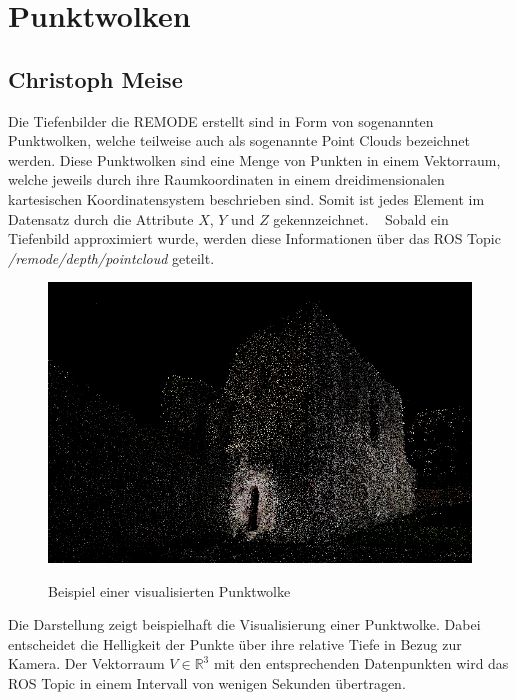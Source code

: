 \section{Punktwolken}
\label{Punktwolken}
\subsection*{Christoph Meise}
Die Tiefenbilder die REMODE erstellt sind in Form von sogenannten Punktwolken, welche teilweise auch als sogenannte Point Clouds bezeichnet werden. Diese Punktwolken sind eine Menge von Punkten in einem Vektorraum, welche jeweils durch ihre Raumkoordinaten in einem dreidimensionalen kartesischen Koordinatensystem beschrieben sind. Somit ist jedes Element im Datensatz durch die Attribute $X$, $Y$ und $Z$ gekennzeichnet. \cite{defPC}\cite{visPC}\ \newline
Sobald ein Tiefenbild approximiert wurde, werden diese Informationen über das ROS Topic \textit{/remode/depth/pointcloud} geteilt. \newline

\begin{figure}[ht]
	\centering
	\includegraphics[scale=0.41]{Bilder/pointcloud_1.jpg}
	\label{fig:pointcloud}
	\caption{Beispiel einer visualisierten Punktwolke \cite{visPC}}
\end{figure}

Die Darstellung zeigt beispielhaft die Visualisierung einer Punktwolke. Dabei entscheidet die Helligkeit der Punkte über ihre relative Tiefe in Bezug zur Kamera. Der Vektorraum $V \in \mathbb{R}^3$ mit den entsprechenden Datenpunkten wird das ROS Topic in einem Intervall von wenigen Sekunden übertragen.\newline

